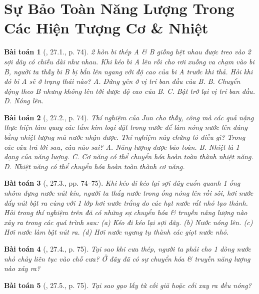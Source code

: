 \documentclass{article}
\newtheorem{baitoan}{Bài toán}
\begin{document}

\section{Sự Bảo Toàn Năng Lượng Trong Các Hiện Tượng Cơ \& Nhiệt}

\begin{baitoan}[\cite{SBT_Vat_Ly_8}, 27.1., p. 74]
	2 hòn bi thép A \& B giống hệt nhau được treo vào 2 sợi dây có chiều dài như nhau. Khi kéo bi A lên rồi cho rơi xuống va chạm vào bi B, người ta thấy bi B bị bắn lên ngang với độ cao của bi A trước khi thả. Hỏi khi đó bi A sẽ ở trạng thái nào? {\sf A.} Đứng yên ở vị trí ban đầu của B. {\sf B.} Chuyển động theo B nhưng không lên tới được độ cao của B. {\sf C.} Bật trở lại vị trí ban đầu. {\sf D.} Nóng lên.
\end{baitoan}

\begin{baitoan}[\cite{SBT_Vat_Ly_8}, 27.2., p. 74]
	Thí nghiệm của Jun cho thấy, công mà các quả nặng thực hiện làm quay các tấm kim loại đặt trong nước để làm nóng nước lên đúng bằng nhiệt lượng mà nước nhận được. Thí nghiệm này chứng tỏ điều gì? Trong các câu trả lời sau, câu nào sai? {\sf A.} Năng lượng được bảo toàn. {\sf B.} Nhiệt là 1 dạng của năng lượng. {\sf C.} Cơ năng có thể chuyển hóa hoàn toàn thành nhiệt năng. {\sf D.} Nhiệt năng có thể chuyển hóa hoàn toàn thành cơ năng.
\end{baitoan}

\begin{baitoan}[\cite{SBT_Vat_Ly_8}, 27.3., pp. 74--75]
	Khi kéo đi kéo lại sợi dây cuốn quanh 1 ống nhôm đựng nước nút kín, người ta thấy nước trong ống nóng lên rồi sôi, hơi nước đẩy nút bật ra cùng với 1 lớp hơi nước trắng do các hạt nước rất nhỏ tạo thành. Hỏi trong thí nghiệm trên đã có những sự chuyển hóa \& truyền năng lượng nào xảy ra trong các quá trình sau: (a) Kéo đi kéo lại sợi dây. (b) Nước nóng lên. (c) Hơi nước làm bật nút ra. (d) Hơi nước ngưng tụ thành các giọt nước nhỏ.
\end{baitoan}

\begin{baitoan}[\cite{SBT_Vat_Ly_8}, 27.4., p. 75]
	Tại sao khi cưa thép, người ta phải cho 1 dòng nước nhỏ chảy liên tục vào chỗ cưa? Ở đây đã có sự chuyển hóa \& truyền năng lượng nào xảy ra?
\end{baitoan}

\begin{baitoan}[\cite{SBT_Vat_Ly_8}, 27.5., p. 75]
	Tại sao gạo lấy từ cối giã hoặc cối xay ra đều nóng?
\end{baitoan}
\end{document}
